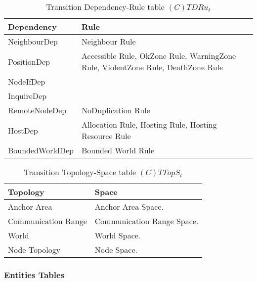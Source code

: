 \begin{table}[H]
	\centering
	\begin{tabular}{|p{4cm}|p{8cm}|}
			\hline
			\textbf{Dependency} & \textbf{Rule} \\
			\hline
			NeighbourDep & Neighbour Rule \\
			\hline
      PositionDep & Accessible Rule, OkZone Rule, WarningZone Rule, ViolentZone
      Rule, DeathZone Rule \\
			\hline
			NodeIfDep & \\
			\hline
			InquireDep & \\
			\hline
      RemoteNodeDep & NoDuplication Rule \\
			\hline
			HostDep & Allocation Rule, Hosting Rule, Hosting Resource Rule\\
			\hline
			BoundedWorldDep & Bounded World Rule\\
			\hline
		\end{tabular}
	\caption{Transition Dependency-Rule table $(C)TDRu_t$}
	\label{tab:ctdrut}
\end{table}

\begin{table}[H]
	\centering
	\begin{tabular}{|p{4cm}|p{8cm}|}
			\hline
			\textbf{Topology} & \textbf{Space} \\
			\hline
			Anchor Area & Anchor Area Space.\\
			\hline
			Communication Range & Communication Range Space. \\
			\hline
			World & World Space. \\
			\hline
			Node Topology & Node Space. \\
			\hline
		\end{tabular}
	\caption{Transition Topology-Space table $(C)TTopS_t$}
	\label{tab:cttopst}
\end{table}

\subsubsection{Entities Tables}

